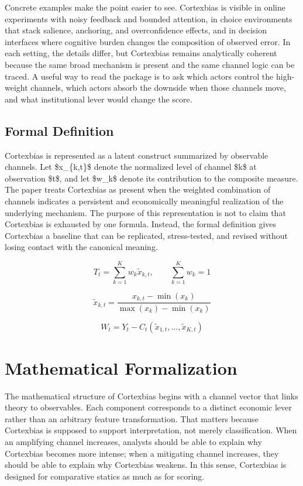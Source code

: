 \documentclass[12pt]{article}
\begin{document}
Concrete examples make the point easier to see. Cortexbias is visible in online experiments with noisy feedback and bounded attention, in choice environments that stack salience, anchoring, and overconfidence effects, and in decision interfaces where cognitive burden changes the composition of observed error. In each setting, the details differ, but Cortexbias remains analytically coherent because the same broad mechanism is present and the same channel logic can be traced. A useful way to read the package is to ask which actors control the high-weight channels, which actors absorb the downside when those channels move, and what institutional lever would change the score.

\subsection{Formal Definition}
Cortexbias is represented as a latent construct summarized by observable channels. Let \$x\_\{k,t\}\$ denote the normalized level of channel \$k\$ at observation \$t\$, and let \$w\_k\$ denote its contribution to the composite measure. The paper treats Cortexbias as present when the weighted combination of channels indicates a persistent and economically meaningful realization of the underlying mechanism. The purpose of this representation is not to claim that Cortexbias is exhausted by one formula. Instead, the formal definition gives Cortexbias a baseline that can be replicated, stress-tested, and revised without losing contact with the canonical meaning.

\begin{equation}
T_t = \sum_{k=1}^K w_k \tilde{x}_{k,t}, \qquad \sum_{k=1}^K w_k = 1
\label{eq:index}
\end{equation}

\begin{equation}
\tilde{x}_{k,t} = \frac{x_{k,t} - \min(x_k)}{\max(x_k) - \min(x_k)}
\label{eq:norm}
\end{equation}

\begin{equation}
W_t = Y_t - C_t(\tilde{x}_{1,t}, \dots, \tilde{x}_{K,t})
\label{eq:welfare}
\end{equation}

\section{Mathematical Formalization}
The mathematical structure of Cortexbias begins with a channel vector that links theory to observables. Each component corresponds to a distinct economic lever rather than an arbitrary feature transformation. That matters because Cortexbias is supposed to support interpretation, not merely classification. When an amplifying channel increases, analysts should be able to explain why Cortexbias becomes more intense; when a mitigating channel increases, they should be able to explain why Cortexbias weakens. In this sense, Cortexbias is designed for comparative statics as much as for scoring.
\end{document}
